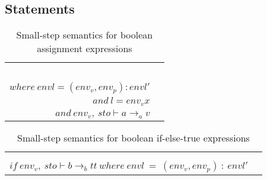 \subsection{Statements}
\begin{table}[H]
    \centering
    \begin{longtable}[c] { r c }
    \begin{tabular}{@{}c@{}} 
    [ASS1] \\
    \newline \\
    \newline \\
    \newline \\
    \end{tabular}
  \begin{tabular}{@{}c@{}}   \( \langle x := a, sto, envl \rangle \Rightarrow (sto[l \mapsto v], envl) \)  \\ \( where \ envl  = (env_v, env_p) : envl' \)
  \\ \( and \ l = env_v x \)
  \\ \( and \ env_v, \ sto \vdash a \rightarrow_a v \)
  \end{tabular}
        
 \end{longtable}
    \caption{Small-step semantics for boolean assignment expressions}\label{sem:bool-ass}
\end{table}
        
        
        
\begin{table}[H]
    \centering
    \begin{longtable}[c] { r c }
    
    \begin{tabular}{@{}c@{}} 
    [IF-ELSE-TRUE] \\
    \newline
    \end{tabular}
  \begin{tabular}{@{}c@{}}   \(
  \langle if \ {b} \ then \ {S_1} \ else \ {S_2} \ sto, envl\rangle \Rightarrow \langle{S_1},sto,envl\rangle
  \)  \\ \(
  if \ env_v, \ sto \vdash b \rightarrow_b {tt} \ where \ envl \ = \ (env_v, env_p) \ : \ envl' 
  \) 
  \end{tabular}
        
 \end{longtable}
    \caption{Small-step semantics for boolean if-else-true expressions}\label{sem:if-else-true}
\end{table}


